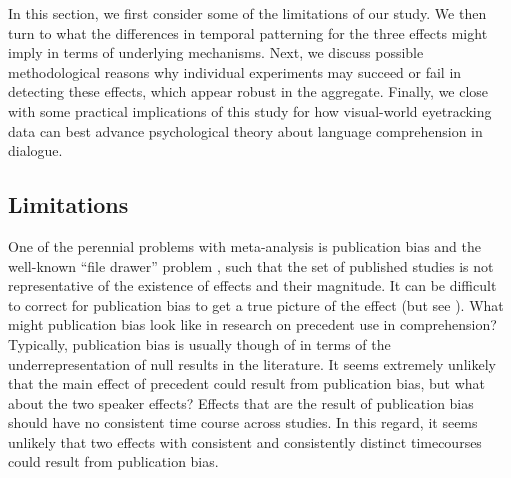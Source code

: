\documentclass[doc,fignum,apacite,floatsintext]{apa6}
\begin{document}
In this section, we first consider some of the limitations of our study.  We then turn to what the differences in temporal patterning for the three effects might imply in terms of underlying mechanisms.  Next, we discuss possible methodological reasons why individual experiments may succeed or fail in detecting these effects, which appear robust in the aggregate.  Finally, we close with some practical implications of this study for how visual-world eyetracking data can best advance psychological theory about language comprehension in dialogue.

\subsection{Limitations}

One of the perennial problems with meta-analysis is publication bias and the well-known ``file drawer'' problem \cite{rosenthal1979file,sterling1959publication}, such that the set of published studies is not representative of the existence of effects and their magnitude.  
It can be difficult to correct for publication bias to get a true picture of the effect (but see ).  What might publication bias look like in research on precedent use in comprehension?  Typically, publication bias is usually though of in terms of the underrepresentation of null results in the literature.  It seems extremely unlikely that the main effect of precedent could result from publication bias, but what about the two speaker effects?  Effects that are the result of publication bias should have no consistent time course across studies.  In this regard, it seems unlikely that two effects with consistent and consistently distinct timecourses could result from publication bias.
\end{document}
